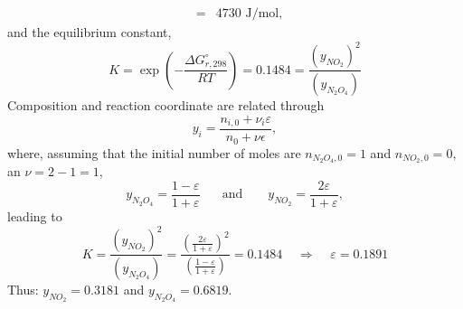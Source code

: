 \documentclass[calculator,allquestions,datasheet,Pens]{exam_newMarcus2}
\newcommand{\frc}{\displaystyle\frac}
\begin{document}
\begin{question}
\begin{enumerate}[a)]
{\begin{eqnarray}
                             &=& 4730 \text{ J/mol}, \nonumber
         \end{eqnarray}
         and the equilibrium constant,
         \begin{displaymath}
             K = \exp\left(-\frc{\Delta G^{\circ}_{r,298}}{RT}\right) = 0.1484 = \frac{\left(y_{NO_{2}}\right)^{2}}{\left(y_{N_{2}O_{4}}\right)}
         \end{displaymath}
         Composition and reaction coordinate are related through
         \begin{displaymath}
            y_{i} = \frc{n_{i,0} + \nu_{i}\varepsilon}{n_{0}+\nu\epsilon},
         \end{displaymath}
         where, assuming that the initial number of moles are $n_{N_{2}O_{4},0}=1$ and $n_{NO_{2},0}=0$, an $\nu= 2-1 = 1$,~
         \begin{displaymath}
            y_{N_{2}O_{4}} = \frc{1-\varepsilon}{1+\varepsilon}\;\;\;\;\;\text{ and }\;\;\;\;\;\; y_{NO_{2}} = \frc{2\varepsilon}{1+\varepsilon},
         \end{displaymath}
         leading to~
         \begin{displaymath}
             K = \frac{\left(y_{NO_{2}}\right)^{2}}{\left(y_{N_{2}O_{4}}\right)} = \frc{\left(\frc{2\varepsilon}{1+\varepsilon}\right)^{2}}{\left(\frc{1-\varepsilon}{1+\varepsilon}\right)} = 0.1484 \;\;\;\;\Longrightarrow\;\;\;\; \varepsilon = 0.1891
         \end{displaymath}
         Thus: $y_{NO_{2}} = 0.3181$ and $y_{N_{2}O_{4}} = 0.6819$.~
           }


\end{enumerate}
\end{question}
\end{document}
